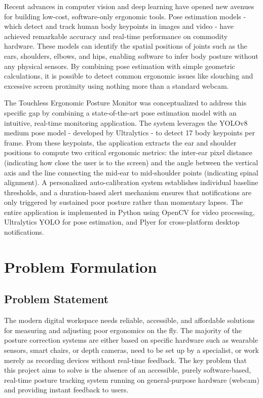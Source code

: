 \documentclass{llncs}
\begin{document}
Recent advances in computer vision and deep learning have opened new avenues for building low-cost, software-only ergonomic tools. Pose estimation models - which detect and track human body keypoints in images and video - have achieved remarkable accuracy and real-time performance on commodity hardware. These models can identify the spatial positions of joints such as the ears, shoulders, elbows, and hips, enabling software to infer body posture without any physical sensors. By combining pose estimation with simple geometric calculations, it is possible to detect common ergonomic issues like slouching and excessive screen proximity using nothing more than a standard webcam.

The Touchless Ergonomic Posture Monitor was conceptualized to address this specific gap by combining a state-of-the-art pose estimation model with an intuitive, real-time monitoring application. The system leverages the YOLOv8 medium pose model - developed by Ultralytics - to detect 17 body keypoints per frame. From these keypoints, the application extracts the ear and shoulder positions to compute two critical ergonomic metrics: the inter-ear pixel distance (indicating how close the user is to the screen) and the angle between the vertical axis and the line connecting the mid-ear to mid-shoulder points (indicating spinal alignment). A personalized auto-calibration system establishes individual baseline thresholds, and a duration-based alert mechanism ensures that notifications are only triggered by sustained poor posture rather than momentary lapses. The entire application is implemented in Python using OpenCV for video processing, Ultralytics YOLO for pose estimation, and Plyer for cross-platform desktop notifications.

\section{Problem Formulation}

\subsection{Problem Statement}
The modern digital workspace needs reliable, accessible, and affordable solutions for measuring and adjusting poor ergonomics on the fly. The majority of the posture correction systems are either based on specific hardware such as wearable sensors, smart chairs, or depth cameras, need to be set up by a specialist, or work merely as recording devices without real-time feedback. The key problem that this project aims to solve is the absence of an accessible, purely software-based, real-time posture tracking system running on general-purpose hardware (webcam) and providing instant feedback to users.
\end{document}

